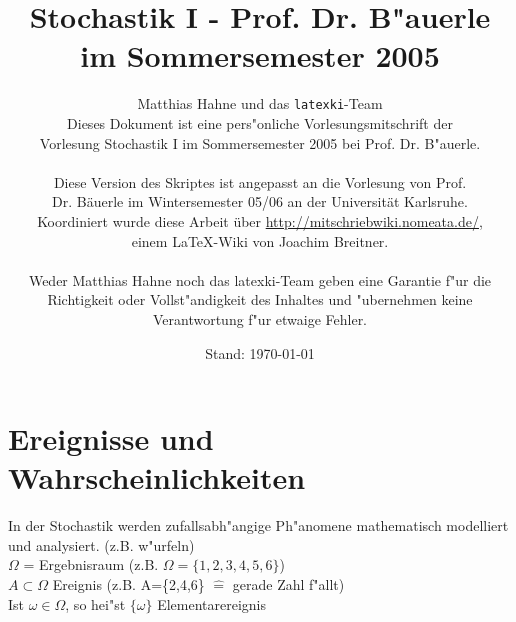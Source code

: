 \documentclass[a4paper,11pt]{book}
\title{Stochastik I - Prof. Dr. B"auerle\\
		im Sommersemester 2005}
\author{Matthias Hahne und das \texttt{latexki}-Team\\[8 cm]
Dieses Dokument ist eine pers"onliche Vorlesungsmitschrift der \\
Vorlesung Stochastik I im Sommersemester 2005 bei Prof. Dr. B"auerle. \\
\\
Diese Version des Skriptes ist angepasst an die Vorlesung von Prof.\\
Dr. Bäuerle im Wintersemester 05/06 an der Universität Karlsruhe.\\
Koordiniert wurde diese Arbeit über \url{http://mitschriebwiki.nomeata.de/},\\
einem \LaTeX-Wiki von Joachim Breitner.\\
\\
Weder Matthias Hahne noch das latexki-Team geben eine Garantie f"ur die \\
Richtigkeit oder Vollst"andigkeit des Inhaltes und "ubernehmen keine\\
Verantwortung f"ur etwaige Fehler.
}
\date{Stand: \today}
\theoremstyle{nonumberplain}
\begin{document}
\thispagestyle{empty}
\maketitle
\newpage
\thispagestyle{empty}
\tableofcontents
\thispagestyle{empty}

\chapter{Ereignisse und Wahrscheinlichkeiten}

\setcounter{page}{1}
In der Stochastik werden zufallsabh"angige Ph"anomene mathematisch modelliert und analysiert. (z.B. w"urfeln)\\
$\Omega$ = Ergebnisraum (z.B. $\Omega = \{1,2,3,4,5,6\}$)\\
$A\subset \Omega$ Ereignis (z.B. A=\{2,4,6\} $\hat{=}$  gerade Zahl f"allt)\\
Ist $\omega \in \Omega$, so hei"st $\{\omega\}$ Elementarereignis
\end{document}
